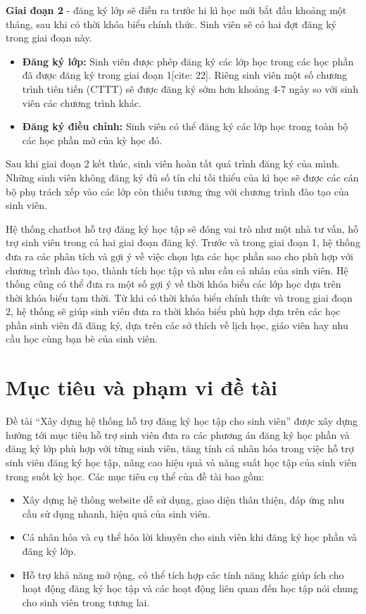 \documentclass[12pt,a4paper]{report}
\begin{document}
\textbf{Giai đoạn 2} - đăng ký lớp sẽ diễn ra trước hi kì học mới bắt đầu khoảng một tháng, sau khi có thời khóa biểu chính thức. Sinh viên sẽ có hai đợt đăng ký trong giai đoạn này. 

\begin{itemize}
    \item \textbf{Đăng ký lớp:} Sinh viên được phép đăng ký các lớp học trong các học phần đã được đăng ký trong giai đoạn 1[cite: 22]. Riêng sinh viên một số chương trình tiên tiến (CTTT) sẽ được đăng ký sớm hơn khoảng 4-7 ngày so với sinh viên các chương trình khác.
    \item \textbf{Đăng ký điều chỉnh:} Sinh viên có thể đăng ký các lớp học trong toàn bộ các học phần mở của kỳ học đó.
\end{itemize}

Sau khi giai đoạn 2 kết thúc, sinh viên hoàn tất quá trình đăng ký của mình. Những sinh viên không đăng ký đủ số tín chỉ tối thiểu của kì học sẽ được các cán bộ phụ trách xếp vào các lớp còn thiếu tương ứng với chương trình đào tạo của sinh viên. 



Hệ thống chatbot hỗ trợ đăng ký học tập sẽ đóng vai trò như một nhà tư vấn, hỗ trợ sinh viên trong cả hai giai đoạn đăng ký. Trước và trong giai đoạn 1, hệ thống đưa ra các phân tích và gợi ý về việc chọn lựa các học phần sao cho phù hợp với chương trình đào tạo, thành tích học tập và nhu cầu cá nhân của sinh viên. Hệ thống cũng có thể đưa ra một số gợi ý về thời khóa biểu các lớp học dựa trên thời khóa biểu tạm thời. Từ khi có thời khóa biểu chính thức và trong giai đoạn 2, hệ thống sẽ giúp sinh viên đưa ra thời khóa biểu phù hợp dựa trên các học phần sinh viên đã đăng ký, dựa trên các sở thích về lịch học, giáo viên hay nhu cầu học cùng bạn bè của sinh viên. 


\section{Mục tiêu và phạm vi đề tài}
Đề tài “Xây dựng hệ thống hỗ trợ đăng ký học tập cho sinh viên” được xây dựng hướng tới mục tiêu hỗ trợ sinh viên đưa ra các phương án đăng ký học phần và đăng ký lớp phù hợp với từng sinh viên, tăng tính cá nhân hóa trong việc hỗ trợ sinh viên đăng ký học tập, nâng cao hiệu quả và năng suất học tập của sinh viên trong suốt kỳ học.
Các mục tiêu cụ thể của đề tài bao gồm: 
\begin{itemize}
    \item Xây dựng hệ thống website dễ sử dụng, giao diện thân thiện, đáp ứng nhu cầu sử dụng nhanh, hiệu quả của sinh viên.
    \item Cá nhân hóa và cụ thể hóa lời khuyên cho sinh viên khi đăng ký học phần và đăng ký lớp.
    \item Hỗ trợ khả năng mở rộng, có thể tích hợp các tính năng khác giúp ích cho hoạt động đăng ký học tập và các hoạt động liên quan đến học tập nói chung cho sinh viên trong tương lai.
\end{itemize}
\end{document}
